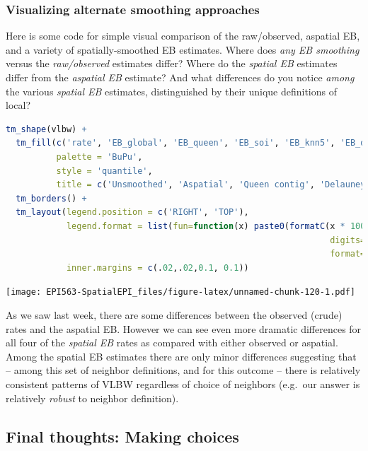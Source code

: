 \documentclass[
]{book}
\begin{document}
\hypertarget{visualizing-alternate-smoothing-approaches}{%
\subsubsection{Visualizing alternate smoothing approaches}\label{visualizing-alternate-smoothing-approaches}}

Here is some code for simple visual comparison of the raw/observed, aspatial EB, and a variety of spatially-smoothed EB estimates. Where does \emph{any EB smoothing} versus the \emph{raw/observed} estimates differ? Where do the \emph{spatial EB} estimates differ from the \emph{aspatial EB} estimate? And what differences do you notice \emph{among} the various \emph{spatial EB} estimates, distinguished by their unique definitions of local?

\begin{lstlisting}[language=R]
tm_shape(vlbw) + 
  tm_fill(c('rate', 'EB_global', 'EB_queen', 'EB_soi', 'EB_knn5', 'EB_dist50'),
          palette = 'BuPu',
          style = 'quantile',
          title = c('Unsmoothed', 'Aspatial', 'Queen contig', 'Delauney', 'Knn = 5', '50-km fixed')) +
  tm_borders() + 
  tm_layout(legend.position = c('RIGHT', 'TOP'),
            legend.format = list(fun=function(x) paste0(formatC(x * 100,
                                                                digits=1, 
                                                                format="f"), "%")),
            inner.margins = c(.02,.02,0.1, 0.1))
\end{lstlisting}

\texttt{[image: EPI563-SpatialEPI\_files/figure-latex/unnamed-chunk-120-1.pdf]}

As we saw last week, there are some differences between the observed (crude) rates and the aspatial EB. However we can see even more dramatic differences for all four of the \emph{spatial EB} rates as compared with either observed or aspatial. Among the spatial EB estimates there are only minor differences suggesting that -- among this set of neighbor definitions, and for this outcome -- there is relatively consistent patterns of VLBW regardless of choice of neighbors (e.g.~our answer is relatively \emph{robust} to neighbor definition).

\hypertarget{final-thoughts-making-choices}{%
\subsection{Final thoughts: Making choices}\label{final-thoughts-making-choices}}
\end{document}
